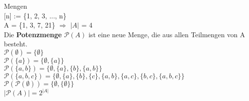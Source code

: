 \documentclass[11pt]{article}
\begin{document}
Mengen \\
{[}n{]} := \{1, 2, 3, ..., n\} \\
A = \{1, 3, 7, 21\} $\Rightarrow$ $\mathopen|A\mathclose|$ = 4 \\
Die {\bfseries Potenzmenge} $\mathcal P(A)$ ist eine neue Menge, die aus allen Teilmengen von A besteht. \\
$\mathcal P(\emptyset) = \{ \emptyset \}$ \\
$\mathcal P(\{ a \}) = \bigl\{ \emptyset, \{ a \} \bigr\}$ \\
$\mathcal P(\{ a, b \}) = \bigl\{ \emptyset, \{ a \}, \{ b \}, \{ a, b \} \bigr\}$ \\
$\mathcal P(\{ a, b, c \}) = \bigl\{ \emptyset, \{ a \}, \{ b \}, \{ c \}, \{ a, b \}, \{ a, c \}, \{ b, c \}, \{ a, b, c \} \bigr\}$ \\
$\mathcal P(\mathcal P(\emptyset)) = \bigl\{ \emptyset, \{\emptyset\}\bigr\}$ \\
$\mathopen|\mathcal P(A)\mathclose| = 2^{\mathopen|A\mathclose|}$ \\
\end{document}
